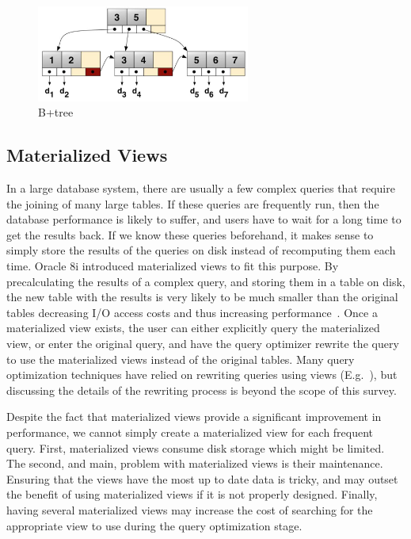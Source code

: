 \documentclass[12pt,a4paper]{article}
\begin{document}
\begin{figure}[!t]
\centering
\includegraphics[width=7cm]{figs/b+tree.png}
\caption{B+tree}
\label{fig:b+tree}
\end{figure}



\subsection{Materialized Views}

In a large database system, there are usually a few complex queries that require the joining of many large tables. If these queries are frequently run, then the
database performance is likely to suffer, and users have to wait for a long time to get the results back. If we know these queries beforehand, it makes sense to
simply store the results of the queries on disk instead of recomputing them each time. Oracle 8i introduced materialized views to fit this purpose. By
precalculating the
results of a complex query, and storing them in a table on disk, the new table with the results is very likely to be much smaller than the original tables
decreasing I/O access costs and thus increasing performance~\cite{lightstone2007physical, chaudhuri1998overview}. Once a materialized view exists, the user can
either explicitly query the materialized view, or enter the original query, and have the query optimizer rewrite the query to use the materialized views instead
of the original tables. Many query optimization techniques have relied on rewriting queries using views (E.g.~\cite{levy1995answering, gupta1995aggregate,
goldstein2001optimizing,
abiteboul1998complexity}), but discussing the details of the rewriting process is beyond the scope of this survey.


Despite the fact that materialized views provide a significant improvement in performance, we cannot simply create a materialized view for each frequent query.
First, materialized views consume disk storage which might be limited. The second, and main, problem with materialized views is their maintenance.
Ensuring
that the views have the most up to date data is tricky, and may outset the benefit of using materialized views if it is not properly designed. Finally, having
several materialized views may increase the cost of searching for the appropriate view to use during the query optimization stage. 
\end{document}
